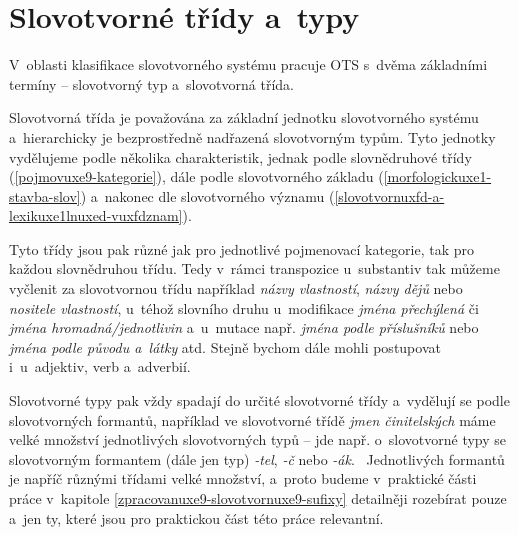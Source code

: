 \hypertarget{slovotvornuxe9-tux159uxeddy-a-typy}{%
\section{Slovotvorné třídy
a~typy}\label{slovotvornuxe9-tux159uxeddy-a-typy}}

V~oblasti klasifikace slovotvorného systému pracuje OTS s~dvěma
základními termíny -- slovotvorný typ a~slovotvorná třída.

Slovotvorná třída je považována za základní jednotku slovotvorného
systému a~hierarchicky je bezprostředně nadřazená slovotvorným typům.
Tyto jednotky vydělujeme podle několika charakteristik, jednak podle
slovnědruhové třídy (\ref{pojmovuxe9-kategorie}), dále podle
slovotvorného základu (\ref{morfologickuxe1-stavba-slov}) a~nakonec dle
slovotvorného významu
(\ref{slovotvornuxfd-a-lexikuxe1lnuxed-vuxfdznam}).
\parencite[107]{dokulil00}

Tyto třídy jsou pak různé jak pro jednotlivé pojmenovací kategorie, tak
pro každou slovnědruhou třídu. Tedy v~rámci transpozice u~substantiv tak
můžeme vyčlenit za slovotvornou třídu například \emph{názvy vlastností},
\emph{názvy dějů} nebo \emph{nositele vlastností}, u~téhož slovního
druhu u~modifikace \emph{jména přechýlená} či \emph{jména
hromadná/jednotlivin} a~u~mutace např. \emph{jména podle příslušníků}
nebo \emph{jména podle původu a~látky} atd. Stejně bychom dále mohli
postupovat i~u~adjektiv, verb a~adverbií.

Slovotvorné typy pak vždy spadají do určité slovotvorné třídy a~vydělují
se podle slovotvorných formantů, například ve slovotvorné třídě
\emph{jmen činitelských} máme velké množství jednotlivých slovotvorných
typů -- jde např. o~slovotvorné typy se slovotvorným formantem (dále jen
typ) \emph{-tel}, \emph{-č} nebo \emph{-ák}.~\parencite[108]{dokulil00}
Jednotlivých formantů je napříč různými třídami velké množství, a~proto
budeme v~praktické části práce v~kapitole
\ref{zpracovanuxe9-slovotvornuxe9-sufixy} detailněji rozebírat pouze
a~jen ty, které jsou pro praktickou část této práce relevantní.
